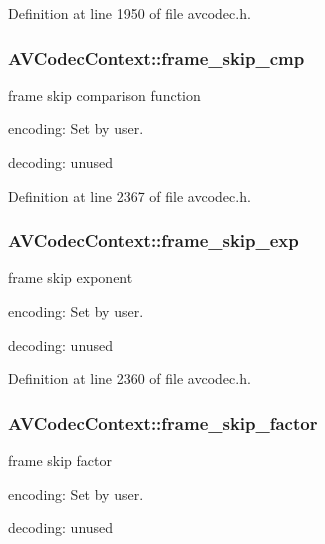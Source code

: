 Definition at line 1950 of file avcodec.\+h.

\subsubsection[{\texorpdfstring{frame\+\_\+skip\+\_\+cmp}{frame_skip_cmp}}]{ A\+V\+Codec\+Context\+::frame\+\_\+skip\+\_\+cmp}\hypertarget{struct_a_v_codec_context_add38d9ccd0605790aaa87bf41d5e1a97}{}\label{struct_a_v_codec_context_add38d9ccd0605790aaa87bf41d5e1a97}
frame skip comparison function
\begin{DoxyItemize}
\item encoding\+: Set by user.
\item decoding\+: unused 
\end{DoxyItemize}

Definition at line 2367 of file avcodec.\+h.

\subsubsection[{\texorpdfstring{frame\+\_\+skip\+\_\+exp}{frame_skip_exp}}]{ A\+V\+Codec\+Context\+::frame\+\_\+skip\+\_\+exp}\hypertarget{struct_a_v_codec_context_a3fd35c9a1dcd66e4b9e0f25c79806582}{}\label{struct_a_v_codec_context_a3fd35c9a1dcd66e4b9e0f25c79806582}
frame skip exponent
\begin{DoxyItemize}
\item encoding\+: Set by user.
\item decoding\+: unused 
\end{DoxyItemize}

Definition at line 2360 of file avcodec.\+h.

\subsubsection[{\texorpdfstring{frame\+\_\+skip\+\_\+factor}{frame_skip_factor}}]{ A\+V\+Codec\+Context\+::frame\+\_\+skip\+\_\+factor}\hypertarget{struct_a_v_codec_context_af872ceacd21fa053421c235e8d796085}{}\label{struct_a_v_codec_context_af872ceacd21fa053421c235e8d796085}
frame skip factor
\begin{DoxyItemize}
\item encoding\+: Set by user.
\item decoding\+: unused 
\end{DoxyItemize}

